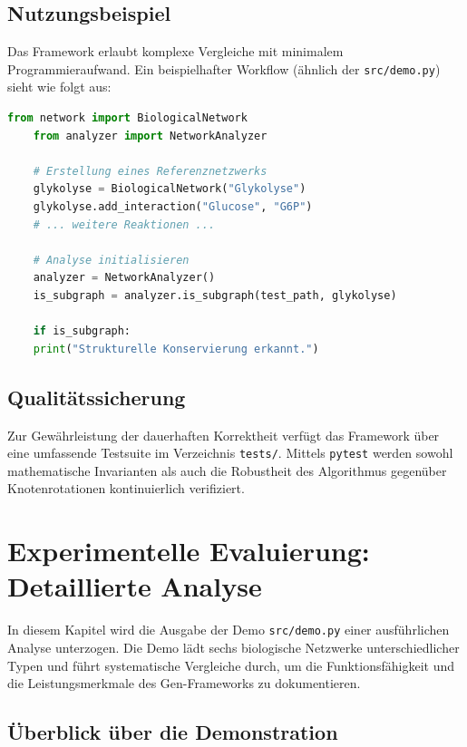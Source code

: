 ﻿\documentclass[a4paper,12pt]{article}
\theoremstyle{definition}
\begin{document}
\subsection{Nutzungsbeispiel}

Das Framework erlaubt komplexe Vergleiche mit minimalem Programmieraufwand. Ein beispielhafter Workflow (ähnlich der \texttt{src/demo.py}) sieht wie folgt aus:

\begin{lstlisting}[language=Python, caption=Beispielhafter Framework-Einsatz]
	from network import BiologicalNetwork
	from analyzer import NetworkAnalyzer
	
	# Erstellung eines Referenznetzwerks
	glykolyse = BiologicalNetwork("Glykolyse")
	glykolyse.add_interaction("Glucose", "G6P")
	# ... weitere Reaktionen ...
	
	# Analyse initialisieren
	analyzer = NetworkAnalyzer()
	is_subgraph = analyzer.is_subgraph(test_path, glykolyse)
	
	if is_subgraph:
	print("Strukturelle Konservierung erkannt.")
\end{lstlisting}

\subsection{Qualitätssicherung}

Zur Gewährleistung der dauerhaften Korrektheit verfügt das Framework über eine umfassende Testsuite im Verzeichnis \texttt{tests/}. Mittels \texttt{pytest} werden sowohl mathematische Invarianten als auch die Robustheit des Algorithmus gegenüber Knotenrotationen kontinuierlich verifiziert.

\section{Experimentelle Evaluierung: Detaillierte Analyse}
\label{sec:demo_analysis}

In diesem Kapitel wird die Ausgabe der Demo \texttt{src/demo.py} einer ausführlichen Analyse unterzogen. Die Demo lädt sechs biologische Netzwerke unterschiedlicher Typen und führt systematische Vergleiche durch, um die Funktionsfähigkeit und die Leistungsmerkmale des Gen-Frameworks zu dokumentieren.

\subsection{Überblick über die Demonstration}
\end{document}
